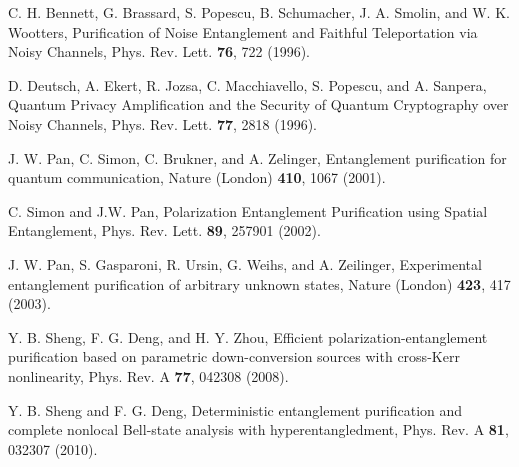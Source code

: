 \documentclass[showpacs,aps,graphicx,twocolumn]{revtex4}
\begin{document}
\begin{thebibliography}{1}
 C. H. Bennett, G. Brassard, S. Popescu, B. Schumacher, J. A. Smolin,
and W. K. Wootters,
 Purification of Noise Entanglement and Faithful Teleportation via Noisy Channels,
 Phys. Rev. Lett. \textbf{76}, 722 (1996).%


 D. Deutsch, A. Ekert, R. Jozsa, C. Macchiavello,
S. Popescu, and A. Sanpera, Quantum Privacy Amplification and
the Security of Quantum Cryptography over Noisy Channels,
Phys. Rev. Lett. \textbf{77}, 2818 (1996).


%




 J. W. Pan, C. Simon, C. Brukner, and A. Zelinger,
Entanglement purification for quantum communication, Nature (London) \textbf{410}, 1067 (2001).


 C. Simon and J.W. Pan,
Polarization Entanglement Purification using Spatial Entanglement,
Phys. Rev. Lett. \textbf{89}, 257901 (2002).


 J. W. Pan, S. Gasparoni, R. Ursin, G. Weihs, and A. Zeilinger,
Experimental entanglement purification of arbitrary unknown states,
Nature (London) \textbf{423}, 417 (2003).






%





 Y. B. Sheng, F. G. Deng, and H. Y. Zhou,
Efficient polarization-entanglement purification based on parametric
down-conversion sources with cross-Kerr nonlinearity, Phys. Rev. A \textbf{77}, 042308 (2008).


 Y. B. Sheng and F. G. Deng, Deterministic entanglement
purification and complete nonlocal Bell-state analysis with hyperentangledment,
Phys. Rev. A \textbf{81}, 032307 (2010).



\end{thebibliography}
\end{document}
